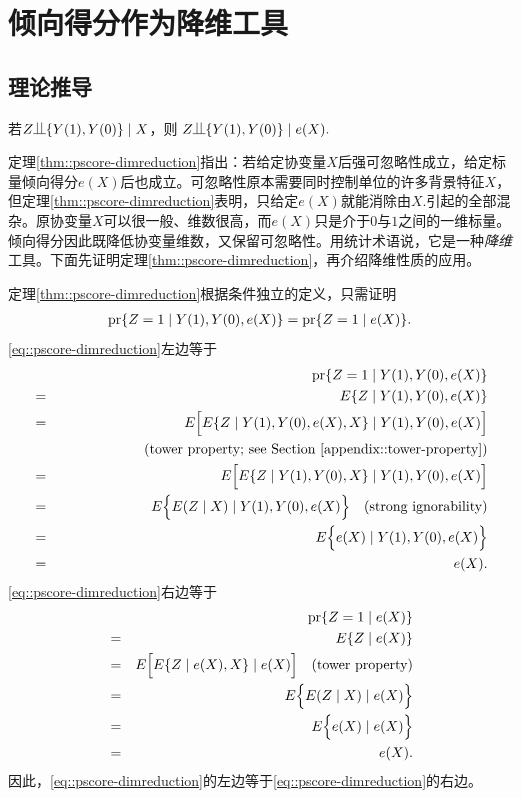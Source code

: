 \section{倾向得分作为降维工具}

\subsection{理论推导}

\begin{theorem}
\label{thm::pscore-dimreduction}
若$Z\ind \{ Y(1), Y(0)  \} \mid X$，则
$
Z\ind \{ Y(1), Y(0)  \} \mid e(X).
$
\end{theorem}

定理\ref{thm::pscore-dimreduction}指出：若给定协变量$X$后强可忽略性成立，给定标量倾向得分$e(X)$后也成立。可忽略性原本需要同时控制单位的许多背景特征$X$，但定理\ref{thm::pscore-dimreduction}表明，只给定$e(X)$就能消除由$X.$引起的全部混杂。原协变量$X$可以很一般、维数很高，而$e(X)$只是介于$0$与$1$之间的一维标量。倾向得分因此既降低协变量维数，又保留可忽略性。用统计术语说，它是一种{\it 降维}工具。下面先证明定理\ref{thm::pscore-dimreduction}，再介绍降维性质的应用。 





\begin{myproof}{定理}{\ref{thm::pscore-dimreduction}}根据条件独立的定义，只需证明
\begin{eqnarray}
\textup{pr}\{ Z=1\mid Y(1), Y(0), e(X)  \} = \textup{pr}\{ Z=1\mid e(X)  \} .
\label{eq::pscore-dimreduction}
\end{eqnarray}
\eqref{eq::pscore-dimreduction}左边等于
\begin{eqnarray*}
&&\textup{pr}\{ Z=1\mid Y(1), Y(0), e(X)  \}  \\
&=& E\{ Z \mid Y(1), Y(0), e(X)  \}  \\
&=& E\Big[   E\{ Z \mid Y(1), Y(0), e(X) , X  \}  \mid   Y(1), Y(0), e(X)    \Big]  \\
&&\quad  \quad  \quad  \quad   \quad \quad \text{(tower property; see Section \ref{appendix::tower-property})} \\
&=& E\Big[   E\{ Z \mid Y(1), Y(0),   X  \}  \mid   Y(1), Y(0), e(X)    \Big]  \\
&=& E\Big\{    E(Z \mid  X  )  \mid   Y(1), Y(0), e(X)    \Big\}  \quad \text{(strong ignorability)} \\
&=& E\Big\{   e(X) \mid   Y(1), Y(0), e(X)    \Big\} \\
&=& e(X).
\end{eqnarray*}
\eqref{eq::pscore-dimreduction}右边等于
\begin{eqnarray*}
&& \textup{pr}\{ Z=1\mid e(X)  \} \\
  &=&  E\{ Z \mid e(X)  \} \\
 &=& E\Big[   E\{ Z \mid e(X), X  \}  \mid e(X)  \Big ] \quad \text{(tower property)} \\
 &=& E\Big\{    E( Z \mid  X )  \mid e(X)  \Big \}   \\
 &=& E\Big\{   e(X)  \mid e(X)  \Big \} \\
 &=& e(X). 
\end{eqnarray*}
因此，\eqref{eq::pscore-dimreduction}的左边等于\eqref{eq::pscore-dimreduction}的右边。 
\end{myproof}


